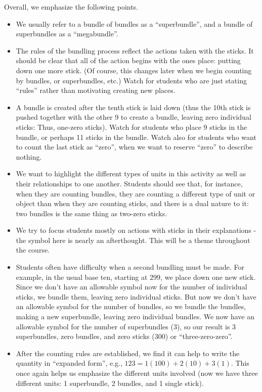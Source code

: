 \documentclass[nooutcomes,noauthor,handout]{ximera}
\begin{document}
\begin{instructorNotes}
Overall, we emphasize the following points.
\begin{itemize}
    \item We usually refer to a bundle of bundles as a ``superbundle'', and a bundle of superbundles as a ``megabundle''.
	\item The rules of the bundling process reflect the actions taken with the sticks. It should be clear that all of the action begins with the ones place:  putting down one more stick. (Of course, this changes later when we begin counting by bundles, or superbundles, etc.)  Watch for students who are just stating ``rules'' rather than motivating creating new places.
	\item A bundle is created after the tenth stick is laid down (thus the 10th stick is pushed together with the other 9 to create a bundle, leaving zero individual sticks: Thus, one-zero sticks). Watch for students who place 9 sticks in the bundle, or perhaps 11 sticks in the bundle. Watch also for students who want to count the last stick as ``zero'', when we want to reserve ``zero'' to describe nothing.
	\item We want to highlight the different types of units in this activity as well as their relationships to one another.  Students should see that, for instance, when they are counting bundles, they are counting a different type of unit or object than when they are counting sticks, and there is a dual nature to it: two bundles is the same thing as two-zero sticks.
	\item We try to focus students mostly on actions with sticks in their explanations - the symbol here is nearly an afterthought. This will be a theme throughout the course.
	\item Students often have difficulty when a second bundling must be made.  For example, in the usual base ten, starting at 299, we place down one new stick.  Since we don't have an allowable symbol now for the number of individual sticks, we bundle them, leaving zero individual sticks.  But now we don't have an allowable symbol for the number of bundles, so we bundle the bundles, making a new superbundle, leaving zero individual bundles.  We now have an allowable symbol for the number of superbundles (3), so our result is 3 superbundles, zero bundles, and zero sticks (300) or ``three-zero-zero''.
	\item After the counting rules are established, we find it can help to write the quantity in ``expanded form'', e.g., $123 = 1(100) + 2(10) + 3(1)$. This once again helps us emphasize the different units involved (now we have three different units: 1 superbundle, 2 bundles, and 1 single stick).
	


\end{itemize}
\end{instructorNotes}
\end{document}
